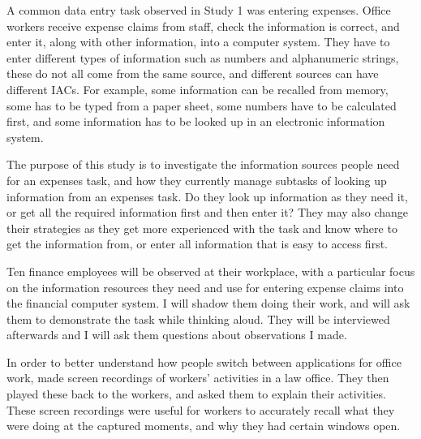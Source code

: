 \documentclass[11pt,oneside]{report}
\begin{document}
A common data entry task observed in Study 1 was entering expenses. Office workers receive expense claims from staff, check the information is correct, and enter it, along with other information, into a computer system. They have to enter different types of information such as numbers and alphanumeric strings, these do not all come from the same source, and different sources can have different IACs. For example, some information can be recalled from memory, some has to be typed from a paper sheet, some numbers have to be calculated first, and some information has to be looked up in an electronic information system. 

The purpose of this study is to investigate the information sources people need for an expenses task, and how they currently manage subtasks of looking up information from an expenses task. Do they look up information as they need it, or get all the required information first and then enter it? They may also change their strategies as they get more experienced with the task and know where to get the information from, or enter all information that is easy to access first.

Ten finance employees will be observed at their workplace, with a particular focus on the information resources they need and use for entering expense claims into the financial computer system. I will shadow them doing their work, and will ask them to demonstrate the task while thinking aloud. They will be interviewed afterwards  and I will ask them questions about observations I made. 

In order to better understand how people switch between applications for office work, \citet{Cangiano2009} made screen recordings of workers' activities in a law office. They then played these back to the workers, and asked them to explain their activities. These screen recordings were useful for workers to accurately recall what they were doing at the captured moments, and why they had certain windows open. 
\end{document}
